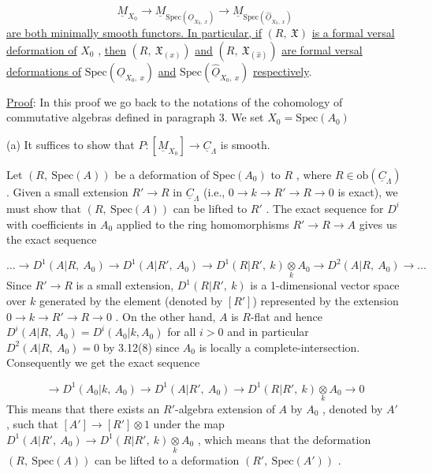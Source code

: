 \begin{equation*}
\underline{M}_{X_0} \to \underline{M}_{\mathrm{Spec}(\underline{O}_{X_0,\ x})} \to \underline{M}_{\mathrm{Spec}(\widehat{\underline{O}}_{X_0,\ x})}
\end{equation*}
\underline{are both minimally smooth functors. In particular, if}  $(R,\ \mathfrak{X})$  \underline{is a formal versal deformation of}  $X_0$  , \underline{then}  $(R,\ \mathfrak{X}_{(x)})$  \underline{and}  $(R,\ \mathfrak{X}_{(\hat{x})})$  \underline{are formal versal deformations of}  $\mathrm{Spec}(\underline{O}_{X_0,\ x})$  \underline{and}  $\mathrm{Spec}(\widehat{\underline{O}}_{X_0,\ x})$  \underline{respectively}.

\underline{Proof}:  In this proof we go back to the notations of the cohomology of commutative algebras defined in paragraph 3. We set  $X_0 = \mathrm{Spec}(A_0)$



(a)  It suffices to show that  $P : [\underline{M}_{X_0}] \to \underline{C}_{\Lambda}$  is smooth.

Let  $(R,\ \mathrm{Spec}(A))$  be a deformation of  $\mathrm{Spec}(A_0)$  to  $R$  , where  $R \in \mathrm{ob}(\underline{C}_{\Lambda})$  . Given a small extension  $R' \to R$  in  $\underline{C}_{\Lambda}$  (i.e.,  $0 \to k \to R' \to R \to 0$  is exact), we must show that  $(R,\ \mathrm{Spec}(A))$  can be lifted to  $R'$  . The exact sequence for  $D^i$  with coefficients in  $A_0$  applied to the ring homomorphisms  $R' \to R \to A$  gives us the exact sequence

\begin{equation*}
\ldots \to D^1(A|R,\ A_0) \to D^1(A|R',\ A_0) \to D^1(R|R',\ k) \underset{k}{\otimes} A_0 \to D^2(A|R,\ A_0) \to \ldots
\end{equation*}
Since  $R' \to R$  is a small extension, $D^1(R|R',\ k)$  is a 1-dimensional vector space over  $k$  generated by the element (denoted by  $[R']$) represented by the extension $0 \to k \to R' \to R \to 0$  . On the other hand,  $A$  is $R$-flat and hence $D^i(A|R,\ A_0) = D^i(A_0|k,A_0)$  for all  $i > 0$  and in particular  $D^2(A|R,\ A_0) = 0$ by 3.12(8) since  $A_0$  is locally a complete-intersection. Consequently we get the exact sequence

\begin{equation*}
\to D^1(A_0|k,\ A_0) \to D^1(A|R',\ A_0) \to D^1(R|R',\ k) \underset{k}{\otimes} A_0 \to 0
\end{equation*}
This means that there exists an $R'$-algebra extension of  $A$  by  $A_0$  , denoted by $A'$  , such that  $[A'] \to [R'] \otimes 1$  under the map  $D^1(A|R',\ A_0) \to D^1(R|R',\ k) \underset{k}{\otimes} A_0$  , which means that the deformation  $(R,\ \mathrm{Spec}(A))$  can be lifted to a deformation $(R',\ \mathrm{Spec}(A'))$  .

